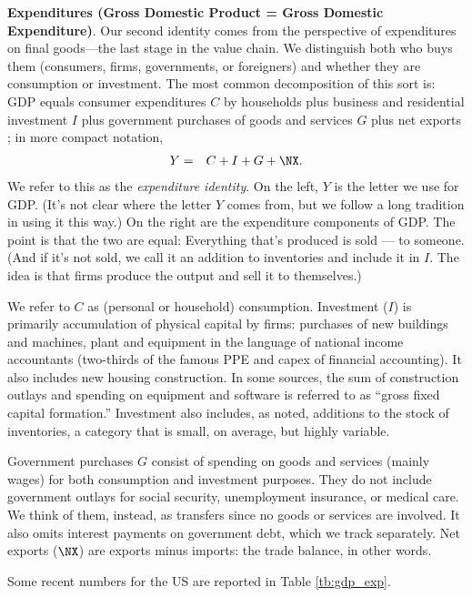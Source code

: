 \textbf{Expenditures (Gross Domestic Product = Gross Domestic Expenditure)}.
Our second identity comes from the perspective of expenditures on final goods---the last stage in the value chain.
We distinguish both who buys them (consumers, firms, governments, or foreigners)
and whether they are consumption or investment.
The most common decomposition
of this sort is: GDP equals consumer expenditures $C$ by households
plus business and residential investment $I$
plus government purchases of goods and services $G$
plus net exports \NX; in more compact notation,
\begin{eqnarray}
    Y &=& C+I+G+\NX .
    \label{eq:exp-identity}
\end{eqnarray}
We refer to this as the {\it expenditure identity\/}.
On the left, $Y$ is the letter we use for GDP.
(It's not clear where the letter $Y$ comes from, but we follow a long tradition in using it this way.)
On the right are the expenditure components of GDP.
The point is that the two are equal:
Everything that's produced is sold --- to someone.
(And if it's not sold, we call it an addition to inventories
and include it in $I$.
The idea is that firms produce the output and sell it to themselves.)


We refer to $C$ as (personal or household) consumption.
Investment ($I$) is primarily accumulation of physical capital by firms:
purchases of new buildings and machines, plant and equipment in
the language of national income accountants (two-thirds of the
famous PPE and capex of financial accounting). It also includes new housing construction.
In some sources, the sum of construction outlays and spending on equipment and software is referred to as ``gross fixed capital formation.''
Investment also includes, as noted, additions to the stock of inventories,
a category that is small, on average, but highly variable.


Government purchases $G$ consist of spending on goods and
services (mainly wages) for both consumption and investment purposes.
They do not include government outlays
for social security, unemployment insurance, or medical care.
We think of them, instead, as transfers since no goods or
services are involved.
It also omits interest payments on government debt, which we track separately.
Net exports ($\NX$) are exports minus imports: the trade balance, in other words.

Some recent numbers for the US are reported in Table \ref{tb:gdp_exp}.

